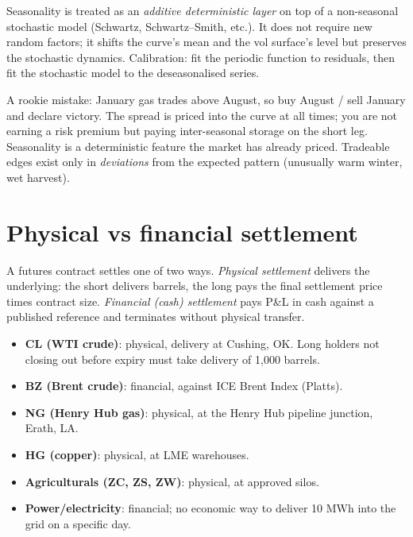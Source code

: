\begin{keyfactbox}
Seasonality is treated as an \emph{additive deterministic layer} on
top of a non-seasonal stochastic model (Schwartz, Schwartz--Smith,
etc.). It does not require new random factors; it shifts the
curve's mean and the vol surface's level but preserves the
stochastic dynamics. Calibration: fit the periodic function to
residuals, then fit the stochastic model to the deseasonalised
series.
\end{keyfactbox}

\begin{pitfallbox}
A rookie mistake: January gas trades above August, so buy August /
sell January and declare victory.  The spread is priced into the
curve at all times; you are not earning a risk premium but paying
inter-seasonal storage on the short leg.  Seasonality is a
deterministic feature the market has already priced.  Tradeable
edges exist only in \emph{deviations} from the expected pattern
(unusually warm winter, wet harvest).
\end{pitfallbox}


\section{Physical vs financial settlement}
\label{sec:physical_financial_settlement}

A futures contract settles one of two ways.  \emph{Physical
settlement} delivers the underlying: the short delivers barrels,
the long pays the final settlement price times contract size.
\emph{Financial (cash) settlement} pays P\&L in cash against a
published reference and terminates without physical transfer.

\begin{itemize}
  \item \textbf{CL (WTI crude)}: physical, delivery at Cushing, OK.
    Long holders not closing out before expiry must take delivery of
    1{,}000 barrels.
  \item \textbf{BZ (Brent crude)}: financial, against ICE Brent
    Index (Platts).
  \item \textbf{NG (Henry Hub gas)}: physical, at the Henry Hub
    pipeline junction, Erath, LA.
  \item \textbf{HG (copper)}: physical, at LME warehouses.
  \item \textbf{Agriculturals (ZC, ZS, ZW)}: physical, at approved
    silos.
  \item \textbf{Power/electricity}: financial; no economic way to
    deliver 10 MWh into the grid on a specific day.
\end{itemize}


